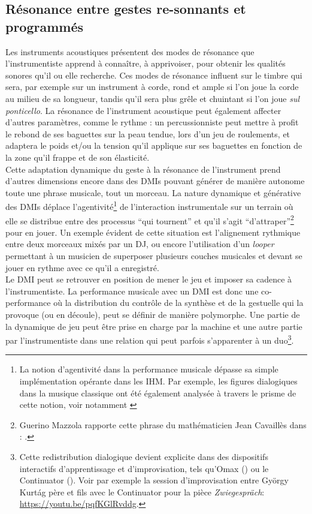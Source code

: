 \subsection{Résonance entre gestes re-sonnants et programmés}

\noindent Les instruments acoustiques présentent des modes de résonance que l'instrumentiste apprend à connaître, à apprivoiser, pour obtenir les qualités sonores qu'il ou elle recherche. Ces modes de résonance influent sur le timbre qui sera, par exemple sur un instrument à corde, rond et ample si l'on joue la corde au milieu de sa longueur, tandis qu'il sera plus grêle et chuintant si l'on joue \textit{sul ponticello}. La résonance de l'instrument acoustique peut également affecter d'autres paramètres, comme le rythme : un percussionniste peut mettre à profit le rebond de ses baguettes sur la peau tendue, lors d'un jeu de roulements, et adaptera le poids et/ou la tension qu'il applique sur ses baguettes en fonction de la zone qu'il frappe et de son élasticité.\\
\indent Cette adaptation dynamique du geste à la résonance de l'instrument prend d'autres dimensions encore dans des \glspl{DMI} pouvant générer de manière autonome toute une phrase musicale, tout un morceau. La nature dynamique et générative des \glspl{DMI} déplace l'agentivité\footnote{La notion d'agentivité dans la performance musicale dépasse sa simple implémentation opérante dans les \gls{IHM}. Par exemple, les figures dialogiques dans la musique classique ont été également analysée à travers le prisme de cette notion, voir notamment \cite{graybill_whose_2016}} de l'interaction instrumentale sur un terrain où elle se distribue entre des processus ``qui tournent'' et qu'il s'agit ``d'attraper''\footnote{Guerino Mazzola rapporte cette phrase du mathématicien Jean Cavaillès dans \cite{mazzola_topos_2018}: .} pour en jouer. Un exemple évident de cette situation est l'alignement rythmique entre deux morceaux mixés par un \gls{DJ}, ou encore l'utilisation d'un \textit{looper} permettant à un musicien de superposer plusieurs couches musicales et devant se jouer en rythme avec ce qu'il a enregistré.\\
\indent Le \gls{DMI} peut se retrouver en position de mener le jeu et imposer sa cadence à l'instrumentiste. La performance musicale avec un \gls{DMI} est donc une co-performance où la distribution du contrôle de la synthèse et de la gestuelle qui la provoque (ou en découle), peut se définir de manière polymorphe. Une partie de la dynamique de jeu peut être prise en charge par la machine et une autre partie par l'instrumentiste dans une relation qui peut parfois s'apparenter à un duo\footnote{Cette redistribution dialogique devient explicite dans des dispositifs interactifs d'apprentissage et d'improvisation, tels qu'Omax (\cite{assayag_omax_2006}) ou le Continuator (\cite{pachet_continuator:_2003}). Voir par exemple la session d'improvisation entre György Kurtág père et fils avec le Continuator pour la pièce \textit{Zwiegespräch}: \url{https://youtu.be/pqfKGlRvddg}. }.\\
